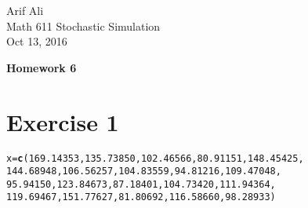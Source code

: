 \documentclass{article}\usepackage[]{graphicx}\usepackage[]{color}
\makeatletter
\newcommand{\hlnum}[1]{\textcolor[rgb]{0.686,0.059,0.569}{#1}}%
\newcommand{\hlstd}[1]{\textcolor[rgb]{0.345,0.345,0.345}{#1}}%
\newcommand{\hlkwb}[1]{\textcolor[rgb]{0.69,0.353,0.396}{#1}}%
\newcommand{\hlkwd}[1]{\textcolor[rgb]{0.737,0.353,0.396}{\textbf{#1}}}%
\newenvironment{kframe}{%
 \def\at@end@of@kframe{}%
 \ifinner\ifhmode%
  \def\at@end@of@kframe{\end{minipage}}%
  \begin{minipage}{\columnwidth}%
 \fi\fi%
 \def\FrameCommand##1{\hskip\@totalleftmargin \hskip-\fboxsep
 \colorbox{shadecolor}{##1}\hskip-\fboxsep
     \hskip-\linewidth \hskip-\@totalleftmargin \hskip\columnwidth}%
 \MakeFramed {\advance\hsize-\width
   \@totalleftmargin\z@ \linewidth\hsize
   \@setminipage}}%
 {\par\unskip\endMakeFramed%
 \at@end@of@kframe}
\newenvironment{knitrout}{}{} %
\makeatother
\begin{document}
\begin{flushright}
Arif Ali\\
Math 611 Stochastic Simulation\\
Oct 13, 2016\\
\end{flushright}

\begin{center}
\LARGE\textbf{Homework 6}
  \end{center}
\section*{Exercise 1}
\begin{knitrout}
\color{fgcolor}\begin{kframe}
\begin{alltt}
\hlstd{x} \hlkwb{=} \hlkwd{c}\hlstd{(}\hlnum{169.14353}\hlstd{,} \hlnum{135.73850}\hlstd{,} \hlnum{102.46566}\hlstd{,}  \hlnum{80.91151}\hlstd{,} \hlnum{148.45425}\hlstd{,}
      \hlnum{144.68948}\hlstd{,} \hlnum{106.56257}\hlstd{,} \hlnum{104.83559}\hlstd{,}\hlnum{94.81216}\hlstd{,} \hlnum{109.47048}\hlstd{,}
      \hlnum{95.94150}\hlstd{,} \hlnum{123.84673}\hlstd{,}  \hlnum{87.18401}\hlstd{,} \hlnum{104.73420}\hlstd{,} \hlnum{111.94364}\hlstd{,}
      \hlnum{119.69467}\hlstd{,} \hlnum{151.77627}\hlstd{,}  \hlnum{81.80692}\hlstd{,} \hlnum{116.58660}\hlstd{,}  \hlnum{98.28933}\hlstd{)}


\end{alltt}
\end{kframe}
\end{knitrout}
\end{document}

